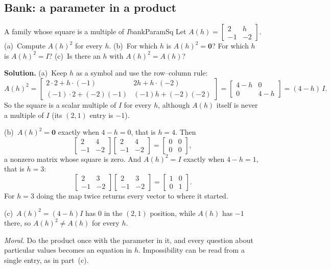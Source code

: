\documentclass[11pt]{article}
\begin{document}
\subsection*{Bank: a parameter in a product}

\begin{exmp}{A family whose square is a multiple of $I$}{bankParamSq}
Let $A(h)=\begin{bmatrix}2&h\\-1&-2\end{bmatrix}$. (a)~Compute $A(h)^2$ for every $h$. (b)~For which $h$ is $A(h)^2=\mathbf{0}$? For which $h$ is $A(h)^2=I$? (c)~Is there an $h$ with $A(h)^2=A(h)$?

\textbf{Solution.} (a)~Keep $h$ as a symbol and use the row--column rule:
\[
A(h)^2=\begin{bmatrix}2\cdot2+h\cdot(-1)&2h+h\cdot(-2)\\(-1)\cdot2+(-2)(-1)&(-1)h+(-2)(-2)\end{bmatrix}=\begin{bmatrix}4-h&0\\0&4-h\end{bmatrix}=(4-h)\,I.
\]
So the square is a scalar multiple of $I$ for every $h$, although $A(h)$ itself is never a multiple of $I$ (its $(2,1)$ entry is $-1$).

(b)~$A(h)^2=\mathbf{0}$ exactly when $4-h=0$, that is $h=4$. Then
\[
\begin{bmatrix}2&4\\-1&-2\end{bmatrix}\begin{bmatrix}2&4\\-1&-2\end{bmatrix}=\begin{bmatrix}0&0\\0&0\end{bmatrix},
\]
a nonzero matrix whose square is zero. And $A(h)^2=I$ exactly when $4-h=1$, that is $h=3$:
\[
\begin{bmatrix}2&3\\-1&-2\end{bmatrix}\begin{bmatrix}2&3\\-1&-2\end{bmatrix}=\begin{bmatrix}1&0\\0&1\end{bmatrix}.
\]
For $h=3$ doing the map twice returns every vector to where it started.

(c)~$A(h)^2=(4-h)I$ has $0$ in the $(2,1)$ position, while $A(h)$ has $-1$ there, so $A(h)^2\neq A(h)$ for every $h$.

\emph{Moral.} Do the product once with the parameter in it, and every question about particular values becomes an equation in $h$. Impossibility can be read from a single entry, as in part~(c).
\end{exmp}
\end{document}
